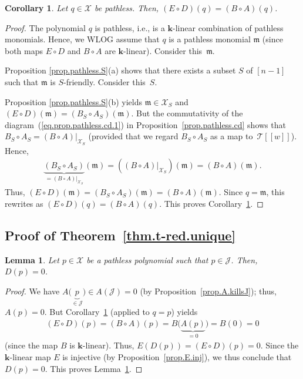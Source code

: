 \documentclass[11pt]{article}
\newtheorem{Corollary}[Theorem]{Corollary}
\newtheorem{Lemma}[Theorem]{Lemma}
\numberwithin{equation}{section}
\begin{document}
\begin{Corollary}\label{cor.pathless.D}Let $q\in\mathcal{X}$ be pathless. Then, $( E\circ D ) (q) = ( B\circ A ) (q) $.
\end{Corollary}

\begin{proof}The polynomial $q$ is pathless, i.e., is a $\mathbf{k}$-linear combination of pathless monomials. Hence, we WLOG assume that $q$ is a pathless monomial $\mathfrak{m}$ (since both maps $E\circ D$ and $B\circ A$ are $\mathbf{k}$-linear). Consider this~$\mathfrak{m}$.

Proposition \ref{prop.pathless.S}(a) shows that there exists a subset $S$ of $[n-1] $ such that $\mathfrak{m}$ is $S$-friendly. Consider this~$S$.

Proposition \ref{prop.pathless.S}(b) yields $\mathfrak{m}\in\mathcal{X}_{S}$ and $(E\circ D) (\mathfrak{m}) = ( B_{S}\circ A_{S} ) (\mathfrak{m}) $. But the commutativity of the diagram~(\ref{eq.prop.pathless.cd.1}) in Proposition~\ref{prop.pathless.cd} shows that $B_{S}\circ A_{S}= ( B\circ A ) |_{\mathcal{X}_{S}}$ (provided that we regard $B_{S}\circ A_{S}$ as a map to~$\mathcal{T}[[w]] $). Hence,
\begin{gather*}
\underbrace{( B_{S}\circ A_{S}) }_{=( B\circ A)|_{\mathcal{X}_{S}}}(\mathfrak{m}) = (( B\circ A ) |_{\mathcal{X}_{S}} ) (\mathfrak{m}) = (B\circ A ) (\mathfrak{m}) .
\end{gather*}
Thus, $(E\circ D) (\mathfrak{m}) = ( B_{S}\circ A_{S}) (\mathfrak{m}) =( B\circ A ) (\mathfrak{m}) $. Since $q=\mathfrak{m}$, this rewrites as $(E\circ D) (q) = ( B\circ A ) (q) $. This proves Corollary~\ref{cor.pathless.D}.
\end{proof}

\subsection{Proof of Theorem~\ref{thm.t-red.unique}}

\begin{Lemma}\label{lem.t-red.unique.0}Let $p\in\mathcal{X}$ be a pathless polynomial such that $p\in\mathcal{J}$. Then, $D(p) =0$.
\end{Lemma}

\begin{proof}We have $A \big( \underbrace{p}_{\in\mathcal{J}} \big) \in A ( \mathcal{J} ) =0$ (by Proposition~\ref{prop.A.killsJ}); thus, $A(p) =0$. But Corollary~\ref{cor.pathless.D} (applied to $q=p$) yields
\begin{gather*}
(E\circ D) (p) =(B\circ A) (p) =B \Big( \underbrace{A(p) }_{=0} \Big) =B ( 0 ) =0
\end{gather*}
(since the map $B$ is $\mathbf{k}$-linear). Thus, $E ( D(p)) =(E\circ D) (p) =0$. Since the $\mathbf{k}$-linear map $E$ is injective (by Proposition~\ref{prop.E.inj}), we thus conclude that $D(p) =0$. This proves Lemma~\ref{lem.t-red.unique.0}.
\end{proof}
\end{document}
